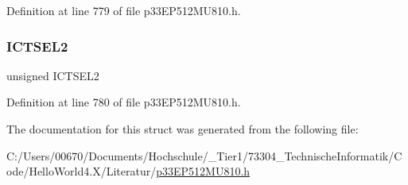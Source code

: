 Definition at line 779 of file p33\+E\+P512\+M\+U810.\+h.

\mbox{\label{structtag_i_c5_c_o_n1_b_i_t_s_a47d80892d449e6edbd5ba2ba9ff06deb}} 
\subsubsection{\texorpdfstring{I\+C\+T\+S\+E\+L2}{ICTSEL2}}
{\footnotesize\ttfamily unsigned I\+C\+T\+S\+E\+L2}



Definition at line 780 of file p33\+E\+P512\+M\+U810.\+h.



The documentation for this struct was generated from the following file\+:\begin{DoxyCompactItemize}
\item 
C\+:/\+Users/00670/\+Documents/\+Hochschule/\+\_\+\+Tier1/73304\+\_\+\+Technische\+Informatik/\+Code/\+Hello\+World4.\+X/\+Literatur/\hyperlink{p33_e_p512_m_u810_8h}{p33\+E\+P512\+M\+U810.\+h}\end{DoxyCompactItemize}
